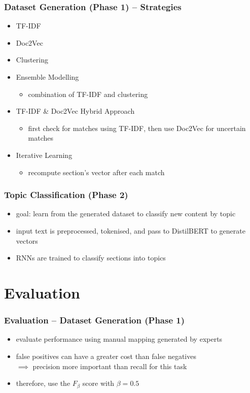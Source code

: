 \documentclass[aspectratio=169]{beamer}
\begin{document}
\begin{frame} \frametitle{Dataset Generation (Phase 1) – Strategies}

\begin{itemize}
    \item TF-IDF
    \item Doc2Vec
    \item Clustering
    \item Ensemble Modelling
    \begin{itemize}
        \item combination of TF-IDF and clustering
    \end{itemize}
    \item TF-IDF \& Doc2Vec Hybrid Approach
    \begin{itemize}
        \item first check for matches using TF-IDF, then use Doc2Vec for uncertain matches
    \end{itemize}
    \item Iterative Learning
    \begin{itemize}
        \item recompute section's vector after each match
    \end{itemize}
\end{itemize}

\end{frame}


\begin{frame} \frametitle{Topic Classification (Phase 2)}

\begin{itemize}
    \item goal: learn from the generated dataset to classify new content by topic \pause
    \item input text is preprocessed, tokenised, and pass to DistilBERT to generate vectors \pause
    \item RNNs are trained to classify sections into topics
\end{itemize}

\end{frame}


\section{Evaluation}


\begin{frame} \frametitle{Evaluation – Dataset Generation (Phase 1)}

\begin{itemize}
    \item evaluate performance using manual mapping generated by experts \pause
    \item false positives can have a greater cost than false negatives \\ $\implies$ precision more important than recall for this task \pause
    \item therefore, use the $F_\beta$ score with $\beta=0.5$
\end{itemize}

\end{frame}
\end{document}
